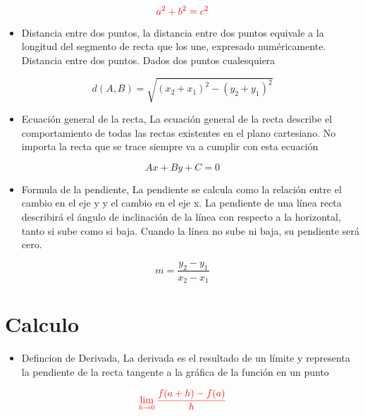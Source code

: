 \documentclass[12pt, letterpaper]{article}
\begin{document}
    $$  \textcolor{red}{a^2 + b^2 = c^2} $$
    
\begin{itemize}
    \item[\bigstar] Distancia entre dos puntos, la distancia entre dos puntos equivale a la longitud del segmento de recta que los une, expresado numéricamente. Distancia entre dos puntos. Dados dos puntos cualesquiera
\end{itemize}
    $$ d(A,B) = \sqrt{(x_2 + x_1)^2 - (y_2 + y_1)^2 }$$
\begin{itemize}
    \item [ \textdaggerdbl ] Ecuación general de la recta, La ecuación general de la recta describe el comportamiento de todas las rectas existentes en el plano cartesiano.
No importa la recta que se trace siempre va a cumplir con esta ecuación
\end{itemize}

    $$ Ax + By + C = 0 $$
    

\begin{itemize}
    \item [\bigstar] Formula de la pendiente, La pendiente se calcula como la relación entre el cambio en el eje y y el cambio en el eje x. La pendiente de una línea recta describirá el ángulo de inclinación de la línea con respecto a la horizontal, tanto si sube como si baja. Cuando la línea no sube ni baja, su pendiente será cero.
\end{itemize}

    $$ m = \frac{y_2 - y_1}{x_2 - x_1}$$
    
    
\section{Calculo}

\begin{itemize}
    \item [\textparagraph] Defincion de Derivada,  La derivada es el resultado de un límite y representa la pendiente de la recta tangente a la gráfica de la función en un punto
\end{itemize}

    $$\textcolor{red}{\lim_{h \rightarrow 0} {\frac{f(a+h)-f(a)}{h}}}$$
    
\end{document}
